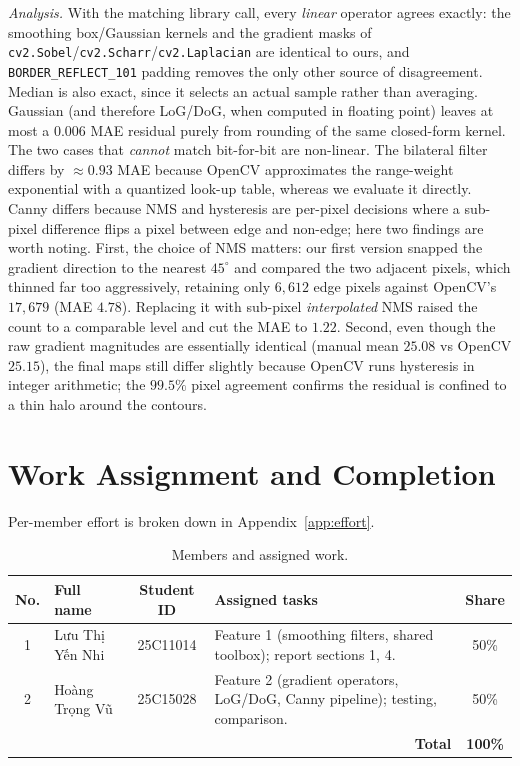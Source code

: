 \documentclass[a4paper,11pt]{article}
\newcommand{\runin}[1]{\par\medskip\noindent\textit{#1}\hspace{0.4em}\ignorespaces}
\begin{document}
\runin{Analysis.} With the matching library call, every \emph{linear} operator
agrees exactly: the smoothing box/Gaussian kernels and the gradient masks of
\texttt{cv2.Sobel}/\texttt{cv2.Scharr}/\texttt{cv2.Laplacian} are identical to ours,
and \texttt{BORDER\_REFLECT\_101} padding removes the only other source of
disagreement. Median is also exact, since it selects an actual sample rather than
averaging. Gaussian (and therefore LoG/DoG, when computed in floating point) leaves
at most a $0.006$ MAE residual purely from rounding of the same closed-form kernel.
The two cases that \emph{cannot} match bit-for-bit are non-linear. The bilateral
filter differs by $\approx0.93$ MAE because OpenCV approximates the range-weight
exponential with a quantized look-up table, whereas we evaluate it directly. Canny
differs because NMS and hysteresis are per-pixel decisions where a sub-pixel
difference flips a pixel between edge and non-edge; here two findings are worth
noting. First, the choice of NMS matters: our first version snapped the gradient
direction to the nearest $45^\circ$ and compared the two adjacent pixels, which
thinned far too aggressively, retaining only $6{,}612$ edge pixels against OpenCV's
$17{,}679$ (MAE $4.78$). Replacing it with sub-pixel \emph{interpolated} NMS raised
the count to a comparable level and cut the MAE to $1.22$. Second, even though the
raw gradient magnitudes are essentially identical (manual mean $25.08$ vs OpenCV
$25.15$), the final maps still differ slightly because OpenCV runs hysteresis in
integer arithmetic; the $99.5\%$ pixel agreement confirms the residual is confined
to a thin halo around the contours.

\section{Work Assignment and Completion}
Per-member effort is broken down in Appendix~\ref{app:effort}.

\begin{table}[H]
\centering
\caption{Members and assigned work.}
\label{tab:members}
\begin{tabular}{c l c p{5.6cm} c}
\toprule
\textbf{No.} & \textbf{Full name} & \textbf{Student ID} & \textbf{Assigned tasks} & \textbf{Share} \\
\midrule
1 & Lưu Thị Yến Nhi & 25C11014 &
  Feature 1 (smoothing filters, shared toolbox); report sections 1, 4. & 50\% \\
2 & Hoàng Trọng Vũ & 25C15028 &
  Feature 2 (gradient operators, LoG/DoG, Canny pipeline); testing, comparison. & 50\% \\
\midrule
\multicolumn{4}{r}{\textbf{Total}} & \textbf{100\%} \\
\bottomrule
\end{tabular}
\end{table}
\end{document}
